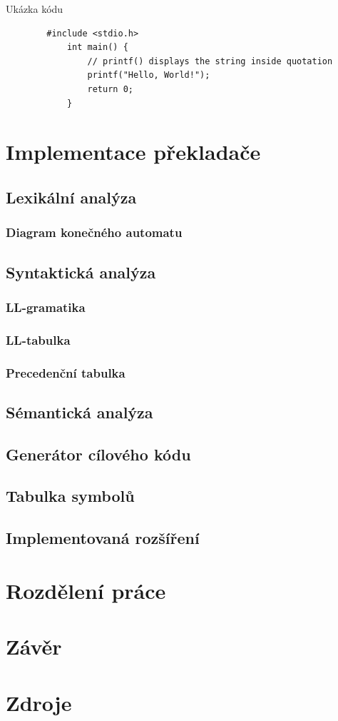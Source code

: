 \documentclass[11pt,a4paper]{article}
\begin{document}
    Ukázka kódu
    \begin{lstlisting}
        #include <stdio.h>
            int main() {
                // printf() displays the string inside quotation
                printf("Hello, World!");
                return 0;
            }\end{lstlisting}
        
\section{Implementace překladače}
    \subsection{Lexikální analýza}
        \subsubsection{Diagram konečného automatu}
    \subsection{Syntaktická analýza}
        \subsubsection{LL-gramatika}
        \subsubsection{LL-tabulka}
        \subsubsection{Precedenční tabulka}
    \subsection{Sémantická analýza}
    \subsection{Generátor cílového kódu}
    \subsection{Tabulka symbolů}
    \subsection{Implementovaná rozšíření}
\section{Rozdělení práce}
\section{Závěr}

\newpage

\section{Zdroje}
    
    
\end{document}
